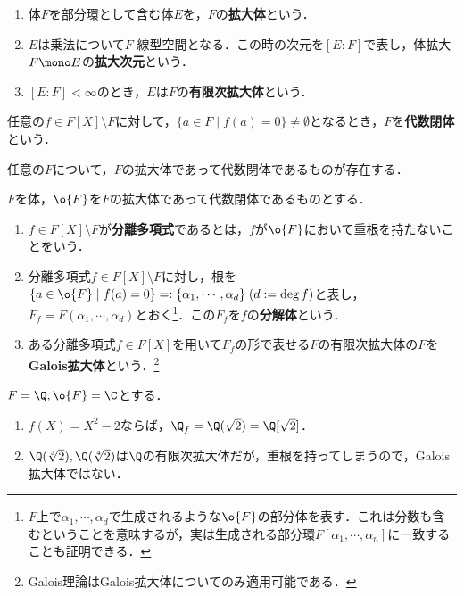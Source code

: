 \documentclass[uplatex,dvipdfmx]{jsreport}
\begin{document}
\begin{definition}\mbox{}
    \begin{enumerate}
        \item 体$F$を部分環として含む体$E$を，$F$の\textbf{拡大体}という．
        \item $E$は乗法について$F$-線型空間となる．この時の次元を$[E:F]$で表し，体拡大$F\mono E$の\textbf{拡大次元}という．
        \item $[E:F]<\infty$のとき，$E$は$F$の\textbf{有限次拡大体}という．
    \end{enumerate}
\end{definition}

\begin{definition}
    任意の$f\in F[X]\setminus F$に対して，$\{a\in F\mid f(a)=0\}\ne\emptyset$となるとき，$F$を\textbf{代数閉体}という．
\end{definition}

\begin{theorem}
    任意の$F$について，$F$の拡大体であって代数閉体であるものが存在する．
\end{theorem}

\begin{definition}
    $F$を体，$\o{F}$を$F$の拡大体であって代数閉体であるものとする．
    \begin{enumerate}
        \item $f\in F[X]\setminus F$が\textbf{分離多項式}であるとは，$f$が$\o{F}$において重根を持たないことをいう．
        \item 分離多項式$f\in F[X]\setminus F$に対し，根を$\{a\in\o{F}\mid f(a)=0\}=:\{\alpha_1,\cdots,\alpha_d\}\;(d:=\deg f)$と表し，$F_f=F(\alpha_1,\cdots,\alpha_d)$とおく\footnote{$F$上で$\alpha_1,\cdots,\alpha_d$で生成されるような$\o{F}$の部分体を表す．これは分数も含むということを意味するが，実は生成される部分環$F[\alpha_1,\cdots,\alpha_n]$に一致することも証明できる．}．この$F_f$を$f$の\textbf{分解体}という．
        \item ある分離多項式$f\in F[X]$を用いて$F_f$の形で表せる$F$の有限次拡大体の$F$を\textbf{Galois拡大体}という．\footnote{Galois理論はGalois拡大体についてのみ適用可能である．}
    \end{enumerate}
\end{definition}
\begin{example}
    $F=\Q,\o{F}=\C$とする．
    \begin{enumerate}
        \item $f(X)=X^2-2$ならば，$\Q_f=\Q(\sqrt{2})=\Q[\sqrt{2}]$．
        \item $\Q(\sqrt[3]{2}),\Q(\sqrt[4]{2})$は$\Q$の有限次拡大体だが，重根を持ってしまうので，Galois拡大体ではない．
    \end{enumerate}
\end{example}
\end{document}
